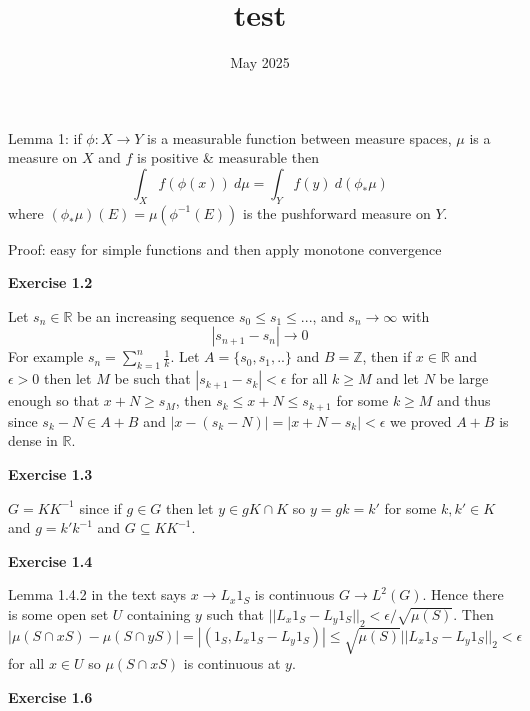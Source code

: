 \documentclass{article}
\title{test}
\date{May 2025}
\begin{document}
Lemma 1: if $\phi : X \rightarrow Y$ is a measurable function between measure spaces, $\mu$ is a measure on $X$ and $f$ is positive \& measurable then $$\int_X f(\phi(x)) \ d\mu = \int_Y f(y) \ d(\phi_*\mu)$$ where $(\phi_*\mu)(E) = \mu(\phi^{-1}(E))$ is the pushforward measure on $Y$.

Proof: easy for simple functions and then apply monotone convergence

\vspace{0.5cm}

\textbf{Exercise 1.2}

\vspace{0.5cm}

Let $s_n \in \mathbb R$ be an increasing sequence $s_0 \leq s_1 \leq ...$, and $s_n \rightarrow \infty$ with 
$$|s_{n+1}-s_n| \rightarrow 0$$ 
For example $s_n = \sum\limits_{k = 1}^n \frac{1}{k}$. Let $A = \{s_0,s_1,.. \}$ and $B = \mathbb Z$, then if $x \in \mathbb R$ and $\epsilon > 0$ then let $M$ be such that $|s_{k+1} - s_k| < \epsilon$ for all $k \geq M$ and let $N$ be large enough so that $x+N \geq s_M$, then $s_{k} \leq x+N \leq s_{k+1}$ for some $k \geq M$ and thus since $s_k -N \in A + B$ and $|x - (s_k -N) | =|x + N - s_k| < \epsilon$ we proved $A+B$ is dense in $\mathbb R$.

\vspace{0.5cm}

\textbf{Exercise 1.3}

\vspace{0.5cm}

$G = KK^{-1}$ since if $g \in G$ then let $y \in gK \cap K$ so $y = gk = k'$ for some $k,k' \in K$ and $g = k'k^{-1}$ and $G \subseteq KK^{-1}$.

\vspace{0.5cm}

\textbf{Exercise 1.4}

\vspace{0.5cm}

Lemma 1.4.2 in the text says $x \rightarrow L_x1_S$ is continuous $G \rightarrow L^2(G)$. Hence there is some open set $U$ containing $y$ such that $||L_x1_S - L_y1_S||_2 < \epsilon/\sqrt{\mu(S)}$. Then  $$|\mu(S\cap xS) - \mu(S\cap yS)| = |(1_S, L_x1_S-L_y1_S)| \leq \sqrt{\mu(S)}||L_x 1_S - L_y 1_S||_2 < \epsilon$$ for all $x \in U$ so $\mu(S\cap xS)$ is continuous at $y$.

\vspace{0.5cm}

\textbf{Exercise 1.6}
\end{document}
